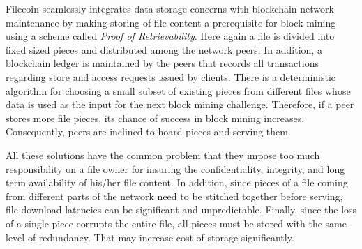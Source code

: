 Filecoin \cite{filecoin} seamlessly integrates data storage concerns with blockchain network maintenance by making storing of file content a prerequisite for block mining using a scheme called {\it Proof of Retrievability}. Here again a file is divided into fixed sized pieces and distributed among the network peers. In addition, a blockchain ledger is maintained by the peers that records all transactions regarding store and access requests issued by clients. There is a deterministic algorithm for choosing a small subset of existing pieces from different files whose data is used as the input for the next block mining challenge. Therefore, if a peer stores more file pieces, its chance of success in block mining increases. Consequently, peers are inclined to hoard pieces and serving them.   

All these solutions have the common problem that they impose too much responsibility on a file owner for insuring the confidentiality, integrity, and long term availability of his/her file content. In addition, since pieces of a file coming from different parts of the network need to be stitched together before serving, file download latencies can be significant and unpredictable. Finally, since the loss of a single piece corrupts the entire file, all pieces must be stored with the same level of redundancy. That may increase cost of storage significantly.

